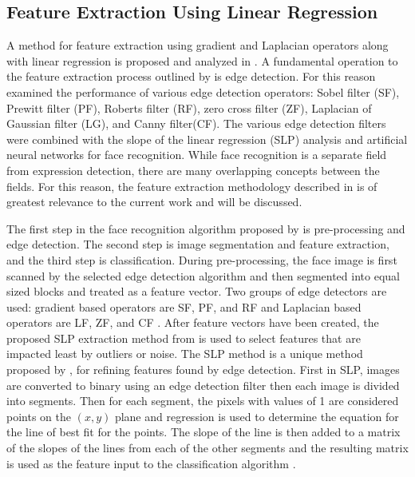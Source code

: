 \subsection{Feature Extraction Using Linear Regression}
A method for feature extraction using gradient and Laplacian operators along with linear regression is proposed and analyzed in \cite{alazzawi2018performance}. A fundamental operation to the feature extraction process outlined by \cite{alazzawi2018performance} is edge detection. For this reason \cite{alazzawi2018performance} examined the performance of various edge detection operators: Sobel filter (SF), Prewitt filter (PF), Roberts filter (RF), zero cross filter (ZF), Laplacian of Gaussian filter (LG), and Canny filter(CF)\cite{alazzawi2018performance}. The various edge detection filters were combined with the slope of the linear regression (SLP) analysis and artificial neural networks for face recognition\cite{alazzawi2018performance}. While face recognition is a separate field from expression detection, there are many overlapping concepts between the fields. For this reason, the feature extraction methodology described in \cite{alazzawi2018performance} is of greatest relevance to the current work and will be discussed.

The first step in the face recognition algorithm proposed by \cite{alazzawi2018performance} is pre-processing and edge detection. The second step is image segmentation and feature extraction, and the third step is classification. During pre-processing, the face image is first scanned by the selected edge detection algorithm and then segmented into equal sized blocks and treated as a feature vector. Two groups of edge detectors are used: gradient based operators are SF, PF, and RF and Laplacian based operators are LF, ZF, and CF \cite{alazzawi2018performance}. After feature vectors have been created, the proposed SLP extraction method from \cite{alazzawi2018performance} is used to select features that are impacted least by outliers or noise. The SLP method is a unique method proposed by \cite{alazzawi2018performance}, for refining features found by edge detection. First in SLP, images are converted to binary using an edge detection filter then each image is divided into segments. Then for each segment, the pixels with values of 1 are considered points on the $(x, y)$ plane and regression is used to determine the equation for the line of best fit for the points. The slope of the line is then added to a matrix of the slopes of the lines from each of the other segments and the resulting matrix is used as the feature input to the classification algorithm \cite{alazzawi2018performance}.

